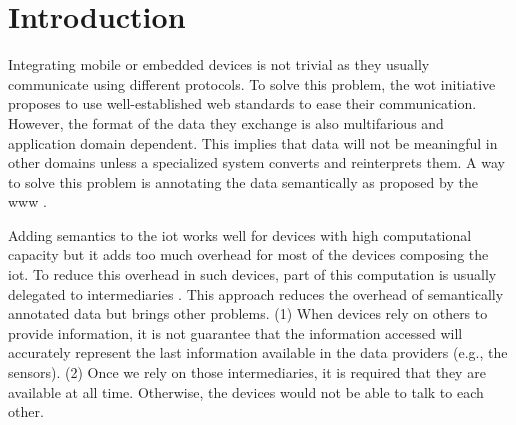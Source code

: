 \section{Introduction}
\label{sec:search_intro}

% 

Integrating mobile or embedded devices is not trivial as they usually communicate using different protocols.
To solve this problem, the \acl{wot} initiative proposes to use well-established web standards to ease their communication.
However, the format of the data they exchange is also multifarious and application domain dependent.
This implies that data will not be meaningful in other domains unless a specialized system converts and reinterprets them.
A way to solve this problem is annotating the data semantically as proposed by the \ac{www} \citep{ChuaG10,kimKC11}.

Adding semantics to the \ac{iot} works well for devices with high computational capacity but it adds too much overhead for most of the devices composing the \ac{iot}.
To reduce this overhead in such devices, part of this computation is usually delegated to intermediaries \citep{honkola_smart-m3_2010}.
This approach reduces the overhead of semantically annotated data but brings other problems.
(1) When devices rely on others to provide information, it is not guarantee that the information accessed will accurately represent the last information available in the data providers (e.g., the sensors).
(2) Once we rely on those intermediaries, it is required that they are available at all time.
Otherwise, the devices would not be able to talk to each other.

